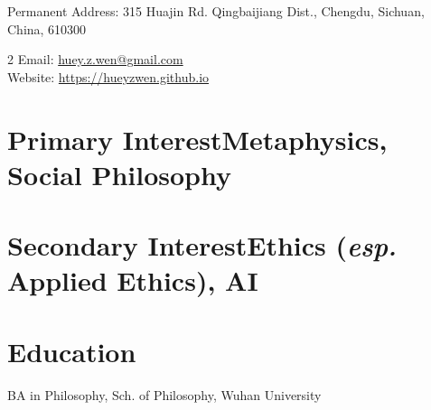 \documentclass[10pt]{article}
\begin{document}
{\Huge {}}

\bigskip

Permanent Address: \hspace*{\fill}315 Huajin Rd. Qingbaijiang Dist., Chengdu, Sichuan, China, 610300

\begin{multicols}{2}
Email: \href{mailto:huey.z.wen@gmail.com}{huey.z.wen@gmail.com}\\
\hspace*{\fill}Website: \href{https://hueyzwen.github.io}{https://hueyzwen.github.io}
\end{multicols}

\section*{Primary Interest\hspace*{\fill}\textnormal{{\normalsize Metaphysics, Social Philosophy}}}
\section*{Secondary Interest\hspace*{\fill}\textnormal{{\normalsize Ethics (\emph{esp.} Applied Ethics), AI}}}

\vspace{0.5cm}


\section*{Education}

\hangindent=0.8cm \quad BA in Philosophy, Sch. of Philosophy, Wuhan University\\
\end{document}
